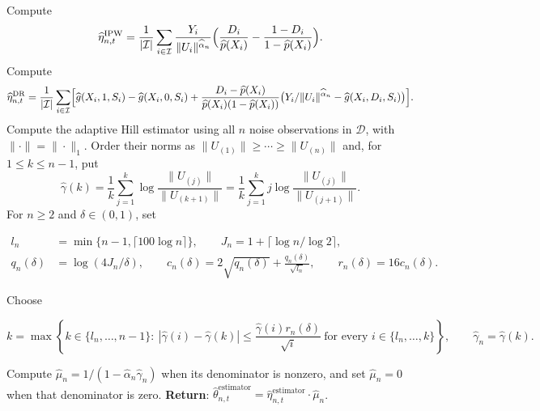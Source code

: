 \documentclass[12pt]{article}
\theoremstyle{plain}
\theoremstyle{definition}
\begin{document}
\begin{algorithm}[!tb]
\begin{algorithmic}[1]
    
        \STATE Compute
        \begin{equation}
            \hat\eta_{n,t}^{\mathrm{IPW}}
          = \frac{1}{|\mathcal{I}|} \sum_{i\in\mathcal{I}} \frac{Y_i}{\|U_i\|^{\hat{\alpha}_n} } \Bigl(\frac{D_i}{\hat p(X_i)} - \frac{1-D_i}{1-\hat p(X_i)}\Bigr).\label{eq:eta_ipw}
        \end{equation}
      \ELSE
        \STATE Compute
        \begin{equation}
            \hat\eta_{n,t}^{\mathrm{DR}} = \frac{1}{|\mathcal{I}|} \sum_{i\in\mathcal{I}}\Bigl[\hat g(X_i,1,S_i)-\hat g(X_i,0,S_i)
          + \frac{D_i-\hat p(X_i)}{\hat p(X_i)(1-\hat p(X_i))}\bigl(Y_i/\|U_i\|^{\hat{\alpha}_{n}}-\hat g(X_i,D_i,S_i)\bigr)\Bigr]. \label{eq:eta_dr}
        \end{equation}
      \ENDIF
      \STATE Compute the adaptive Hill estimator using all $n$ noise observations in $\mathcal D$, with $\|\cdot\|=\|\cdot\|_1$. Order their norms as $\|U_{(1)}\|\geq\cdots\geq\|U_{(n)}\|$ and, for $1\leq k\leq n-1$, put
\begin{equation}
\label{eq:mu}
\hat\gamma(k)=\frac1k\sum_{j=1}^k\log\frac{\|U_{(j)}\|}{\|U_{(k+1)}\|}
=\frac1k\sum_{j=1}^k j\log\frac{\|U_{(j)}\|}{\|U_{(j+1)}\|}.
\end{equation}
For $n\geq2$ and $\delta\in(0,1)$, set

\[
\begin{aligned}
l_n&=\min\{n-1,\lceil100\log n\rceil\},\qquad J_n=1+\lceil\log n/\log2\rceil,\\
q_n(\delta)&=\log(4J_n/\delta),\qquad
c_n(\delta)=2\sqrt{q_n(\delta)}+\frac{q_n(\delta)}{\sqrt{l_n}},\qquad r_n(\delta)=16c_n(\delta).
\end{aligned}
\]

Choose

\[
k=\max\left\{k\in\{l_n,\ldots,n-1\}:\ |\hat\gamma(i)-\hat\gamma(k)|\leq\frac{\hat\gamma(i)r_n(\delta)}{\sqrt i}\ \text{for every }i\in\{l_n,\ldots,k\}\right\},
\qquad \hat\gamma_n=\hat\gamma(k).
\]

Compute $\hat\mu_n=1/(1-\hat\alpha_n\hat\gamma_n)$ when its denominator is nonzero, and set $\hat\mu_n=0$ when that denominator is zero. \textbf{Return}: $\widehat\theta_{n,t}^{\mathrm{estimator}}=\hat\eta_{n,t}^{\mathrm{estimator}}\cdot\hat\mu_n$.
  \end{algorithmic}
\end{algorithm}
\end{document}
